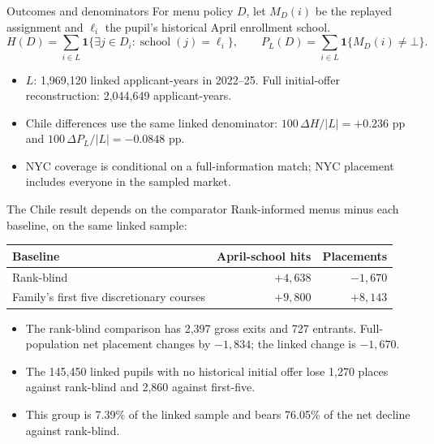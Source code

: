 
\begin{frame}{Outcomes and denominators}
\small
For menu policy $D$, let $M_D(i)$ be the replayed assignment and $\ell_i$
the pupil's historical April enrollment school.
\[
 H(D)=\sum_{i\in L}\mathbf{1}\{\exists j\in D_i:\operatorname{school}(j)=\ell_i\},
 \qquad
 P_L(D)=\sum_{i\in L}\mathbf{1}\{M_D(i)\ne\bot\}.
\]
\begin{itemize}
  \item $L$: 1,969,120 linked applicant-years in 2022--25.
  Full initial-offer reconstruction: 2,044,649 applicant-years.
  \item Chile differences use the same linked denominator:
  $100\,\Delta H/|L|=+0.236$ pp and
  $100\,\Delta P_L/|L|=-0.0848$ pp.
  \item NYC coverage is conditional on a full-information match;
  NYC placement includes everyone in the sampled market.
\end{itemize}
\end{frame}

\begin{frame}{The Chile result depends on the comparator}
\small
Rank-informed menus minus each baseline, on the same linked sample:
\begin{center}
\begin{tabular}{lrr}
\hline
Baseline & April-school hits & Placements\\
\hline
Rank-blind & $+4,638$ & $-1,670$\\
Family's first five discretionary courses & $+9,800$ & $+8,143$\\
\hline
\end{tabular}
\end{center}
\begin{itemize}
  \item The rank-blind comparison has 2,397 gross exits and 727 entrants.
  Full-population net placement changes by $-1,834$; the linked change is $-1,670$.
  \item The 145,450 linked pupils with no historical initial offer lose
  1,270 places against rank-blind and 2,860 against first-five.
  \item This group is 7.39\% of the linked sample and bears 76.05\%
  of the net decline against rank-blind.
\end{itemize}
\end{frame}

